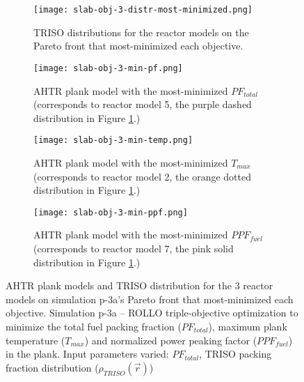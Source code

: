\begin{figure}[htbp!]
    \centering
    \begin{subfigure}{0.85\textwidth}
        \texttt{[image: slab-obj-3-distr-most-minimized.png]}
        \caption{TRISO distributions for the reactor models on the Pareto front
        that most-minimized each objective.}
        \label{fig:slab-obj-3-distr-most-minimized}
    \end{subfigure}
    \begin{subfigure}{0.8\textwidth}
        \texttt{[image: slab-obj-3-min-pf.png]}
        \caption{\gls{AHTR} plank model with the most-minimized $PF_{total}$ 
        (corresponds to reactor model 5, the purple dashed distribution in 
        Figure \ref{fig:slab-obj-3-distr-most-minimized}.)}
        \label{fig:slab-obj-3-min-pf} 
    \end{subfigure}
    \begin{subfigure}{0.8\textwidth}
        \texttt{[image: slab-obj-3-min-temp.png]}
        \caption{\gls{AHTR} plank model with the most-minimized $T_{max}$
        (corresponds to reactor model 2, the orange dotted distribution in
        Figure \ref{fig:slab-obj-3-distr-most-minimized}.)}
        \label{fig:slab-obj-3-min-temp} 
    \end{subfigure}
    \begin{subfigure}{0.8\textwidth}
        \texttt{[image: slab-obj-3-min-ppf.png]}
        \caption{\gls{AHTR} plank model with the most-minimized $PPF_{fuel}$
        (corresponds to reactor model 7, the pink solid distribution in
        Figure \ref{fig:slab-obj-3-distr-most-minimized}.)}
        \label{fig:slab-obj-3-min-ppf} 
    \end{subfigure}
    \caption{AHTR plank models and TRISO distribution for the 3 reactor models on 
    simulation p-3a's Pareto front that most-minimized each objective.
    Simulation p-3a -- ROLLO triple-objective optimization to minimize the total fuel 
    packing fraction ($PF_{total}$), maximum plank temperature ($T_{max}$) and 
    normalized power peaking factor ($PPF_{fuel}$) in the plank. 
    Input parameters varied: $PF_{total}$, TRISO packing fraction distribution
    ($\rho_{TRISO}(\vec{r})$)}
    \label{fig:slab-obj-3-most-minimized}
\end{figure}

